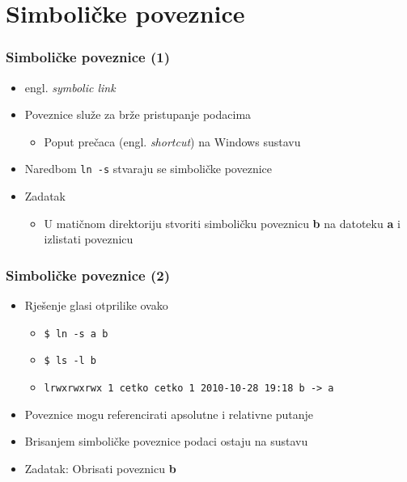 \documentclass{beamer}
\newcommand{\shell}[1]{\texttt{#1}}
\begin{document}
\section{Simboličke poveznice}
\begin{frame}[t]
\frametitle{Simboličke poveznice (1)}
\begin{itemize}
  \item engl. \emph{symbolic link}
  \item Poveznice služe za brže pristupanje podacima
  \begin{itemize}
    \item Poput prečaca (engl. \emph{shortcut}) na Windows sustavu
  \end{itemize}
  \item Naredbom \shell{ln -s} stvaraju se simboličke poveznice
  \item Zadatak
  \begin{itemize}
    \item U matičnom direktoriju stvoriti simboličku poveznicu \textbf{b}
          na datoteku \textbf{a} i izlistati poveznicu
  \end{itemize}
\end{itemize}
\end{frame}

\begin{frame}[t]
\frametitle{Simboličke poveznice (2)}
\begin{itemize}
  \item Rješenje glasi otprilike ovako
  \begin{itemize}
    \item[] \shell{\$ ln -s a b}
    \item[] \shell{\$ ls -l b}
    \item[] \shell{\footnotesize lrwxrwxrwx 1 cetko cetko 1 2010-10-28 19:18 b -> a}
  \end{itemize}
  \item Poveznice mogu referencirati apsolutne i relativne putanje 
  \item Brisanjem simboličke poveznice podaci ostaju na sustavu
  \item Zadatak: Obrisati poveznicu \textbf{b}
\end{itemize}
\end{frame}
\end{document}
